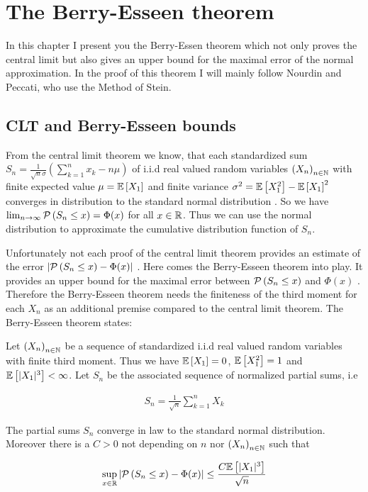 \chapter{The Berry-Esseen theorem}

In this chapter I present you the Berry-Essen theorem which not only proves the central limit but also gives an upper bound for the maximal error of the normal approximation. In the proof of this theorem I will mainly follow Nourdin and Peccati\cite[p. 71 ff.]{nourdin}, who use the Method of Stein.

\section{CLT and Berry-Esseen bounds}

From the central limit theorem we know, that each standardized sum $S_n = \tfrac 1{\sqrt n\sigma} \left(\sum_{k=1}^n x_k - n\mu\right)$ of i.i.d real valued random variables $\seq{X_n}$ with finite expected value $\mu=\E{X_1}$ and finite variance $\sigma^2=\E{X_1^2}-\E{X_1}^2$ converges in distribution to the standard normal distribution . So we have $\lim_{n\to\infty} \P{S_n\le x} = \Phi(x)$ for all $x\in\R$. Thus we can use the normal distribution to approximate the cumulative distribution function of $S_n$.

Unfortunately not each proof of the central limit theorem provides an estimate of the error $\abs{\P{S_n\le x}-\Phi(x)}$ . Here comes the Berry-Esseen theorem into play. It provides an upper bound for the maximal error between $\P{S_n \le x}$ and $\Phi(x)$ . Therefore the Berry-Esseen theorem needs the finiteness of the third moment for each $X_n$ as an additional premise compared to the central limit theorem. The Berry-Esseen theorem states\cite[p. 71]{nourdin}:

\begin{theorem}
  Let $\seq{X_n}$ be a sequence of standardized i.i.d real valued random variables with finite third moment. Thus we have $\E{X_1}=0$, $\E{X_1^2}=1$ and $\E{|X_1|^3} < \infty$. Let $S_n$ be the associated sequence of normalized partial sums, i.e

  \begin{align}
    S_n = \frac{1}{\sqrt n} \sum_{k=1}^n X_k
  \end{align}

  The partial sums $S_n$ converge in law to the standard normal distribution. Moreover there is a $C > 0$ not depending on $n$ nor $\seq{X_n}$ such that

  \begin{align}
    \sup_{x\in\R} \abs{\P{S_n\le x}-\Phi(x)} \le \frac{C \E{|X_1|^3}}{\sqrt n}
  \end{align}
\end{theorem}

